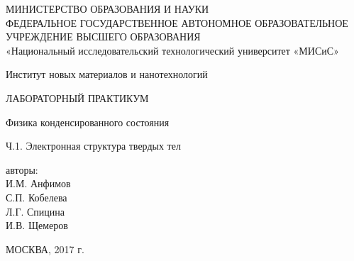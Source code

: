 \begin{titlepage}

\begin{center}
МИНИСТЕРСТВО ОБРАЗОВАНИЯ И НАУКИ \\
ФЕДЕРАЛЬНОЕ ГОСУДАРСТВЕННОЕ АВТОНОМНОЕ ОБРАЗОВАТЕЛЬНОЕ УЧРЕЖДЕНИЕ ВЫСШЕГО ОБРАЗОВАНИЯ \\
«Национальный исследовательский технологический университет «МИСиС»

Институт новых материалов и нанотехнологий

\vspace{2cm}

ЛАБОРАТОРНЫЙ ПРАКТИКУМ

Физика конденсированного состояния

Ч.1. Электронная структура твердых тел

\vspace{3cm}

авторы: \\
И.М. Анфимов \\
С.П. Кобелева \\
Л.Г. Спицина \\
И.В. Щемеров

\vspace{3cm}

МОСКВА, 2017 г.
\end{center}

\end{titlepage}